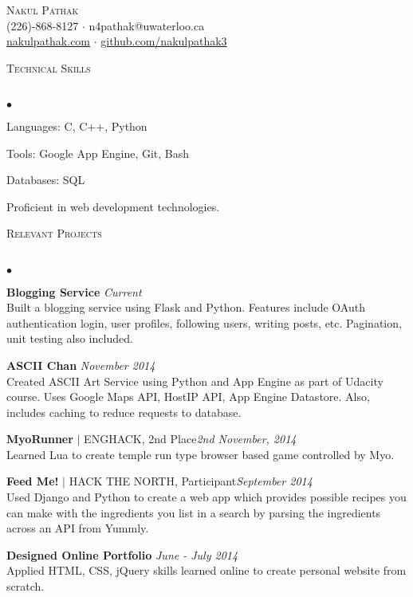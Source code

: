 \documentclass{article}
\newcommand{\lineunder}{\vspace*{-8pt} \\ \hspace*{-18pt} \hrulefill \\}
\newcommand{\header}[1]{{\hspace*{-15pt}\vspace*{6pt} \textsc{#1}} \vspace*{-6pt} \lineunder}
\newenvironment{achievements}{\begin{list}{$\bullet$}{\topsep 0pt \itemsep -1.5pt \leftmargin 5pt}}{\vspace*{4pt}\end{list}}
\begin{document}
\small
\smallskip
\vspace*{-45pt}

\begin{center}
	{\huge \scshape {Nakul Pathak}} \\
\vspace*{6pt} 
(226)-868-8127 $\cdot$ n4pathak@uwaterloo.ca \\
\vspace{1.5pt}
  \url{nakulpathak.com}  $\cdot$ \url{github.com/nakulpathak3}
\end{center}


\vspace{-10pt}
\header{\normalsize Technical Skills}
\begin{achievements}
\item Languages: C, C++, Python
\item Tools: Google App Engine, Git, Bash
\item Databases: SQL
\item Proficient in web development technologies.
\end{achievements}

\vspace{7pt}

\header{\normalsize Relevant Projects}
\begin{achievements}
\item \textbf{Blogging Service}  \hfill \textit {Current}
\\ Built a blogging service using Flask and Python. Features include OAuth authentication login, user profiles, following users, writing posts, etc. Pagination, unit testing also included.
\item \textbf{ASCII Chan} \hfill \textit {November 2014}
\\ Created ASCII Art Service using Python and App Engine as part of Udacity course. Uses Google Maps API, HostIP API, App Engine Datastore. Also, includes caching to reduce requests to database. 
\item\textbf{MyoRunner} {$|$ \scriptsize ENGHACK, 2nd Place}\hfill\textit{2nd November, 2014}
\\ Learned Lua to create temple run type browser based game controlled by Myo.
\item \textbf{Feed Me!} {$|$ \scriptsize HACK THE NORTH, Participant}\hfill \textit {September 2014}
\\ Used Django and Python to create a web app which provides possible recipes you can make with the ingredients you list in a search by parsing the ingredients across an API from Yummly.
\item \textbf{Designed Online Portfolio} \hfill \textit {June - July 2014}
\\ Applied HTML, CSS, jQuery skills learned online to create personal website from scratch.
\end{achievements}
\end{document}

